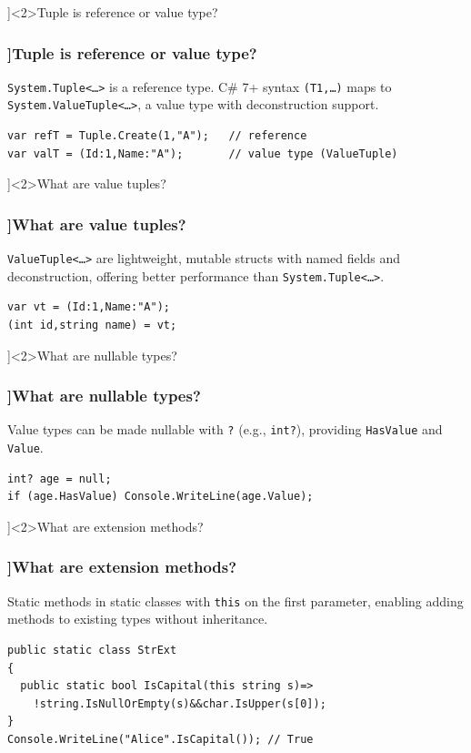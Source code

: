 \QuestionSlide[\CategoryBadge[LangColor!20]{Language Feature}]<2>{Tuple is reference or value type?}
\begin{frame}[fragile]
  \frametitle{\AnswerTitle[\CategoryBadge[LangColor!20]{Language Feature}]{Tuple is reference or value type?}}

  {\footnotesize
    \texttt{System.Tuple<…>} is a reference type.  
    C\# 7+ syntax \texttt{(T1,…)} maps to \texttt{System.ValueTuple<…>}, a value type with deconstruction support.
  }

  \begin{verbatim}
var refT = Tuple.Create(1,"A");   // reference
var valT = (Id:1,Name:"A");       // value type (ValueTuple)
  \end{verbatim}
\end{frame}

\QuestionSlide[\CategoryBadge[LangColor!20]{Language Feature}]<2>{What are value tuples?}
\begin{frame}[fragile]
  \frametitle{\AnswerTitle[\CategoryBadge[LangColor!20]{Language Feature}]{What are value tuples?}}

  {\footnotesize
    \texttt{ValueTuple<…>} are lightweight, mutable structs with named fields and deconstruction, offering better performance than \texttt{System.Tuple<…>}.
  }

  \begin{verbatim}
var vt = (Id:1,Name:"A");
(int id,string name) = vt;
  \end{verbatim}
\end{frame}

\QuestionSlide[\CategoryBadge[LangColor!20]{Language Feature}]<2>{What are nullable types?}
\begin{frame}[fragile]
  \frametitle{\AnswerTitle[\CategoryBadge[LangColor!20]{Language Feature}]{What are nullable types?}}

  {\footnotesize
    Value types can be made nullable with \texttt{?} (e.g., \texttt{int?}), providing \texttt{HasValue} and \texttt{Value}.
  }

  \begin{verbatim}
int? age = null;
if (age.HasValue) Console.WriteLine(age.Value);
  \end{verbatim}
\end{frame}

\QuestionSlide[\CategoryBadge[LangColor!20]{Language Feature}]<2>{What are extension methods?}
\begin{frame}[fragile]
  \frametitle{\AnswerTitle[\CategoryBadge[LangColor!20]{Language Feature}]{What are extension methods?}}

  {\footnotesize
    Static methods in static classes with \texttt{this} on the first parameter, enabling adding methods to existing types without inheritance.
  }

  \begin{verbatim}
public static class StrExt
{
  public static bool IsCapital(this string s)=>
    !string.IsNullOrEmpty(s)&&char.IsUpper(s[0]);
}
Console.WriteLine("Alice".IsCapital()); // True
  \end{verbatim}
\end{frame}

